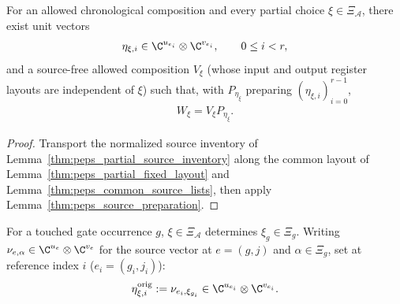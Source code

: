 \begin{lemma}
    \label{thm:peps_partial_fixed_preparation}
    \leanok
    For an allowed chronological composition and every partial choice $\xi\in\Xi_{\mathcal A}$, there exist unit vectors
    \begin{align}
        \eta_{\xi,i}\in
        \C^{u_{e_i}}\otimes\C^{v_{e_i}},
        \qquad 0\leq i<r,
        \label{eq:peps_partial_fixed_unit_vectors}
    \end{align}
    and a source-free allowed composition $V_\xi$ (whose input and output register layouts are independent of $\xi$) such that, with $P_{\eta_\xi}$ preparing $(\eta_{\xi,i})_{i=0}^{r-1}$,
    \begin{align}
        W_\xi=V_\xi P_{\eta_\xi}.
        \label{eq:peps_partial_fixed_preparation}
    \end{align}
\end{lemma}
\begin{proof}
    \leanok
    Transport the normalized source inventory of Lemma~\ref{thm:peps_partial_source_inventory} along the common layout of Lemma~\ref{thm:peps_partial_fixed_layout} and Lemma~\ref{thm:peps_common_source_lists}, then apply Lemma~\ref{thm:peps_source_preparation}.
\end{proof}

\begin{definition}
    \label{def:peps_partial_original_source_vector}
    \leanok
    For a touched gate occurrence $g$, $\xi\in\Xi_{\mathcal A}$ determines $\xi_g\in\Xi_g$. Writing $\nu_{e,\alpha}\in\C^{u_e}\otimes\C^{v_e}$ for the source vector at $e=(g,j)$ and $\alpha\in\Xi_g$, set at reference index $i$ ($e_i=(g_i,j_i)$):
    \begin{align}
        \eta^{\mathrm{orig}}_{\xi,i}
        :=\nu_{e_i,\xi_{g_i}}\in\C^{u_{e_i}}\otimes\C^{v_{e_i}}.
        \label{eq:peps_partial_original_source_vector}
    \end{align}
\end{definition}

